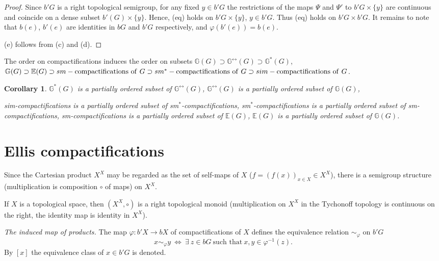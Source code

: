 \documentclass{amsart}
\newtheorem{cor}[thm]{Corollary}
\begin{document}
\begin{proof}
Since $b' G$ is a right topological semigroup, for any fixed $y\in b' G$ the restrictions of the maps $\Psi$ and $\Psi'$ to $b' G\times\{y\}$ are continuous and coincide on a dense subset  $b'(G)\times\{y\}$. Hence, (eq) holds on $b' G\times\{y\}$, $y\in b' G$. Thus (eq) holds on $b' G\times b' G$. It remains to note that $b (e)$, $b'(e)$ are identities in $b G$ and $b' G$ respectively, and $\varphi (b' (e))=b (e)$. 

\medskip

(e) follows from (c) and (d). 
\end{proof}

The order on compactifications induces the order on subsets $\mathbb{G}(G)\supset\mathbb{G}^{\leftrightarrow}(G)\supset\mathbb{G}^*(G)$, $\mathbb{G}(G)\supset\mathbb{E}(G)\supset sm-{\rm compactifications\ of}\ G\supset  sm^*-{\rm compactifications\ of}\ G\supset  sim-{\rm compactifications\ of}\ G$. 

\begin{cor} 
$\mathbb{G}^* (G)$ is a partially ordered subset of $\mathbb{G}^{\leftrightarrow} (G)$, $\mathbb{G}^{\leftrightarrow} (G)$ is a partially ordered subset of $\mathbb{G} (G)$,

sim-compactifications is a partially ordered subset of sm$^*$-compactifications,  sm$^*$-compactifications is a partially ordered subset of sm-compactifications, sm-compactifications is a partially ordered subset of $\mathbb{E}(G)$, $\mathbb{E}(G)$ is a partially ordered subset of $\mathbb{G} (G)$.
\end{cor}


\section{Ellis compactifications}

Since the Cartesian product $X^X$ may be regarded as the set of self-maps of $X$ ($f=(f(x))_{x\in X}\in X^X$), there is a semigroup structure (multiplication is composition $\circ$ of maps) on $X^X$.

If $X$ is a topological space, then $(X^X, \circ)$ is a right topological monoid (multiplication on $X^X$ in the Tychonoff topology is continuous on the right, the identity map is identity in $X^X$).   

{\it The induced map of products.} The map $\varphi: b' X\to b X$ of compactifications of $X$ defines the equivalence relation $\sim_{\varphi}$ on $b' G$ 
$$x\sim_{\varphi}y\ \Longleftrightarrow\ \exists\ z\in b G\ \mbox{such that}\ x, y\in \varphi^{-1}(z).$$
By $[x]$ the equivalence class of $x\in b' G$ is denoted. 
\end{document}
